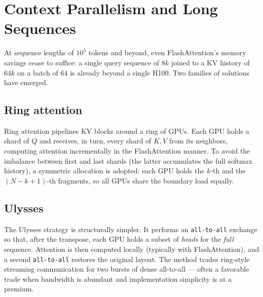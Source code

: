 \documentclass[11pt,a4paper]{article}
\theoremstyle{definition}
\theoremstyle{remark}
\theoremstyle{plain}
\begin{document}
\section{Context Parallelism and Long Sequences}
\label{sec:ctx}


At sequence lengths of $10^5$ tokens and beyond, even FlashAttention's memory savings cease to suffice: a single query sequence of $8k$ joined to a KV history of $64k$ on a batch of $64$ is already beyond a single H100. Two families of solutions have emerged.

\subsection{Ring attention}

Ring attention pipelines KV blocks around a ring of GPUs. Each GPU holds a shard of $Q$ and receives, in turn, every shard of $K,V$ from its neighbors, computing attention incrementally in the FlashAttention manner. To avoid the imbalance between first and last shards (the latter accumulates the full softmax history), a symmetric allocation is adopted: each GPU holds the $k$-th and the $(N-k+1)$-th fragments, so all GPUs share the boundary load equally.

\subsection{Ulysses}

The Ulysses strategy is structurally simpler. It performs an \texttt{all-to-all} exchange so that, after the transpose, each GPU holds a subset of \emph{heads} for the \emph{full} sequence. Attention is then computed locally (typically with FlashAttention), and a second \texttt{all-to-all} restores the original layout. The method trades ring-style streaming communication for two bursts of dense all-to-all --- often a favorable trade when bandwidth is abundant and implementation simplicity is at a premium.

\begin{center}
\end{center}
\end{document}
